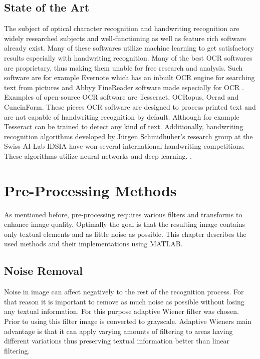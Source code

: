 \documentclass{article}
\begin{document}
    \subsection{State of the Art}
      The subject of optical character recognition and handwriting recognition are widely researched subjects and well-functioning as well as feature rich software already exist. Many of these softwares utilize machine learning to get satisfactory results especially with handwriting recognition. Many of the best OCR softwares are proprietary, thus making them unable for free research and analysis. Such software are for example Evernote which has an inbuilt OCR engine for searching text from pictures \cite{Kelly} and Abbyy FineReader software made especially for OCR \cite{ABBYY}. Examples of open-source OCR software are Tesseract\cite{Smith2007a}, OCRopus\cite{Breuel2007}, Ocrad\cite{FreeSoftwareFoundation2016} and CuneinForm\cite{CognitiveTechnologies2016}. These pieces OCR software are designed to process printed text and are not capable of handwriting recognition by default. Although for example Tesseract can be trained to detect any kind of text.\cite{Smith2007a} Additionally, handwriting recognition algorithms developed by J{\"u}rgen Schmidhuber's research group at the Swiss AI Lab IDSIA have won several international handwriting competitions. These algorithms utilize neural networks and deep learning. \cite{Angelica}.

  \newpage
  \section{Pre-Processing Methods}
  As mentioned before, pre-processing requires various filters and transforms to enhance image quality. Optimally the goal is that the resulting image contains only textual elements and as little noise as possible. This chapter describes the used methods and their implementations using MATLAB.

        \subsection{Noise Removal}
          Noise in image can affect negatively to the rest of the recognition process. For that reason it is important to remove as much noise as possible without losing any textual information. For this purpose adaptive Wiener filter was chosen. Prior to using this filter image is converted to grayscale. Adaptive Wieners main advantage is that it can apply varying amounts of filtering to areas having different variations thus preserving textual information better than linear filtering.\cite{TheMathWorksWiener}
\end{document}
